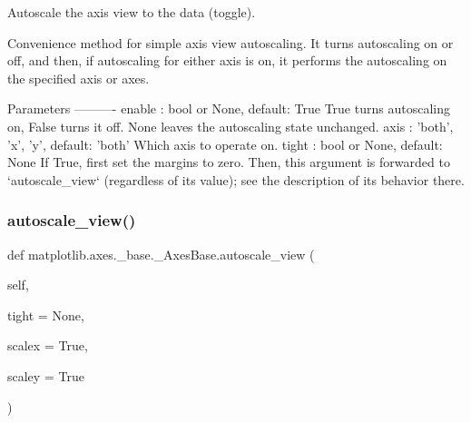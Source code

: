 \begin{DoxyVerb}Autoscale the axis view to the data (toggle).

Convenience method for simple axis view autoscaling.
It turns autoscaling on or off, and then,
if autoscaling for either axis is on, it performs
the autoscaling on the specified axis or axes.

Parameters
----------
enable : bool or None, default: True
    True turns autoscaling on, False turns it off.
    None leaves the autoscaling state unchanged.
axis : {'both', 'x', 'y'}, default: 'both'
    Which axis to operate on.
tight : bool or None, default: None
    If True, first set the margins to zero.  Then, this argument is
    forwarded to `autoscale_view` (regardless of its value); see the
    description of its behavior there.
\end{DoxyVerb}
 \mbox{\label{classmatplotlib_1_1axes_1_1__base_1_1__AxesBase_a17efd4daf13c9bd629b2896cc9a7e9b0}} 
\subsubsection{\texorpdfstring{autoscale\+\_\+view()}{autoscale\_view()}}
{\footnotesize\ttfamily def matplotlib.\+axes.\+\_\+base.\+\_\+\+Axes\+Base.\+autoscale\+\_\+view (\begin{DoxyParamCaption}\item[{}]{self,  }\item[{}]{tight = {\ttfamily None},  }\item[{}]{scalex = {\ttfamily True},  }\item[{}]{scaley = {\ttfamily True} }\end{DoxyParamCaption})}

